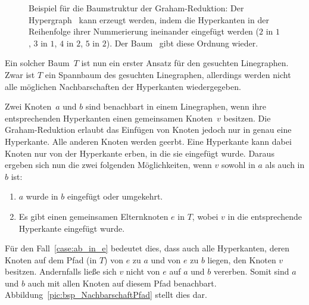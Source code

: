 \begin{figure}[htbp]
{
    }
    \hspace*{\fill}
    \caption[Beispiel für die Baumstruktur der Graham-Reduktion]
    {Beispiel für die Baumstruktur der Graham-Reduktion: Der Hypergraph~ kann erzeugt werden, indem die Hyperkanten in der Reihenfolge ihrer Nummerierung ineinander eingefügt werden ($2$ in $1$, $3$ in $1$, $4$ in $2$, $5$ in $2$). Der Baum~ gibt diese Ordnung wieder.}
    \label{pic:bsp_BaumstrukturGraham}
\end{figure}

Ein solcher Baum~$T$ ist nun ein erster Ansatz für den gesuchten Linegraphen. Zwar ist $T$ ein Spannbaum des gesuchten Linegraphen, allerdings werden nicht alle möglichen Nachbarschaften der Hyperkanten wiedergegeben.

Zwei Knoten~$a$ und $b$ sind benachbart in einem Linegraphen, wenn ihre entsprechenden Hyperkanten einen gemeinsamen Knoten~$v$ besitzen. Die Graham-Reduktion erlaubt das Einfügen von Knoten jedoch nur in genau eine Hyperkante. Alle anderen Knoten werden geerbt. Eine Hyperkante kann dabei Knoten nur von der Hyperkante erben, in die sie eingefügt wurde. Daraus ergeben sich nun die zwei folgenden Möglichkeiten, wenn $v$ sowohl in $a$ als auch in $b$ ist:

\begin{enumerate}
    \item \label{case:a_in_b} $a$ wurde in $b$ eingefügt oder umgekehrt.
    \item \label{case:ab_in_e} Es gibt einen gemeinsamen Elternknoten $e$ in $T$, wobei $v$ in die entsprechende Hyperkante eingefügt wurde.
\end{enumerate}

Für den Fall~\ref{case:ab_in_e} bedeutet dies, dass auch alle Hyperkanten, deren Knoten auf dem Pfad (in $T$) von $e$ zu $a$ und von $e$ zu $b$ liegen, den Knoten $v$ besitzen. Andernfalls ließe sich $v$ nicht von $e$ auf $a$ und $b$ vererben. Somit sind $a$ und $b$ auch mit allen Knoten auf diesem Pfad benachbart. Abbildung~\ref{pic:bsp_NachbarschaftPfad} stellt dies dar.

